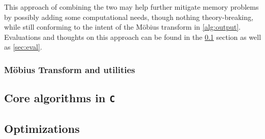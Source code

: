 This approach of combining the two may help further mitigate memory problems by possibly adding some computational needs, though nothing theory-breaking, while still conforming to the intent of the Möbius transform in \cref{alg:output}. Evaluations and thoughts on this approach can be found in the \cref{sec:impl:c} section as well as \cref{sec:eval}.

\subsubsection{Möbius Transform and utilities}

\subsection{Core algorithms in \texttt{C}} \label{sec:impl:c}


\subsection{Optimizations}


